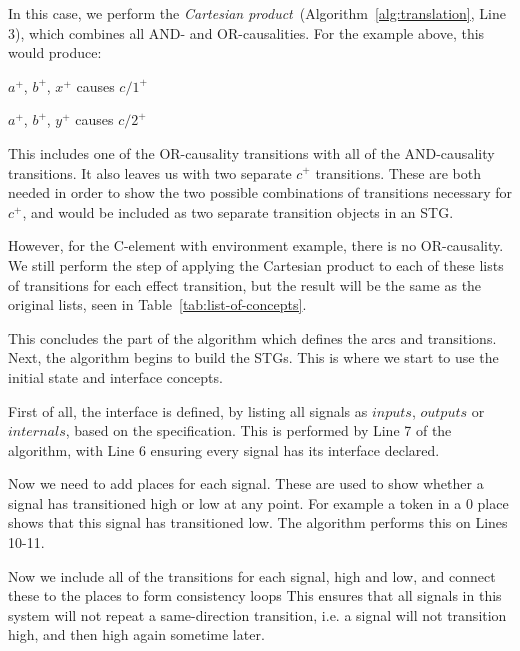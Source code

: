 \documentclass[british, 10pt, conference, compsocconf]{IEEEtran}
\begin{document}
In this case, we perform the \emph{Cartesian product}~(Algorithm~\ref{alg:translation}, Line 3), which combines
all AND- and OR-causalities. For the example above, this would produce:

\vspace{-2mm}

\begin{center}

$a^{+}$, $b^{+}$, $x^{+}$ causes $c/1^{+}$

$a^{+}$, $b^{+}$, $y^{+}$ causes $c/2^{+}$

\end{center}

\vspace{-2mm}

\noindent This includes one of the OR-causality transitions with all of the 
AND-causality transitions. It also leaves us with two separate $c^{+}$ 
transitions. These are both needed in order to show the two possible 
combinations of transitions necessary for $c^{+}$, and would be included as two
separate transition objects in an STG. 

However, for the C-element with environment example, there is no OR-causality. 
We still perform the step of applying the Cartesian product to each of these 
lists of transitions for each effect transition, but the result will be the 
same as the original lists, seen in Table~\ref{tab:list-of-concepts}.

This concludes the part of the algorithm which defines the arcs
and transitions. Next, the algorithm begins to build the STGs. This is where
we start to use the initial state and interface concepts. 

First of all, the interface is defined, by listing all signals as 
$inputs$, $outputs$ or $internals$, based on the specification. This
is performed by Line 7 of the algorithm, with Line 6 ensuring every
signal has its interface declared. 

Now we need to add places for each signal. These are used to
show whether a signal has transitioned high or low at any point. 
For example a token in a $0$ place shows that this signal has 
transitioned low. The algorithm performs this on Lines 10-11.  

Now we include all of the 
transitions for each signal, high and low, and connect these to the places to form consistency loops
This ensures that all signals in this system will not repeat a same-direction transition, i.e. a signal will
not transition high, and then high again sometime later.
\end{document}
